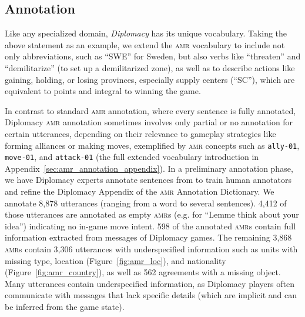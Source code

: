 \documentclass[oneside]{memoir}
\newcommand{\amr}[1]{\texttt{#1}}
\newcommand{\abr}[1]{\textsc{#1}}
\begin{document}
\subsection{Annotation}
\label{sec:amr_annotation}

%
Like any specialized domain, \textit{Diplomacy} has its unique
vocabulary.
%
Taking the above statement as an example, we extend the \abr{amr}
vocabulary to include not only abbreviations, such as ``SWE'' for
Sweden, but also verbs like ``threaten'' and ``demilitarize'' (to set
up a demilitarized zone), as well as to describe actions like gaining,
holding, or losing provinces, especially supply centers (``SC''),
which are equivalent to points and integral to winning the game.

In contrast to standard \abr{amr} annotation, where every sentence is fully annotated, Diplomacy \abr{amr} annotation sometimes involves only partial or no annotation for certain utterances, depending on their relevance to gameplay strategies like forming alliances or making moves, exemplified by \abr{amr} concepts such as \amr{ally-01}, \amr{move-01}, and \amr{attack-01} (the full extended vocabulary introduction in
Appendix~\ref{sec:amr_annotation_appendix}).
%
In a preliminary annotation phase, we have Diplomacy experts annotate sentences from \citet{peskov2020takes} to train human annotators and refine the Diplomacy Appendix of the \abr{amr} Annotation Dictionary.
%
We annotate 8,878 utterances
(ranging from a word to several sentences).
%
4,412 of those utterances are annotated as empty \abr{amr}s (e.g. for
``Lemme think about your idea'') indicating no in-game move intent.
%
598 of the annotated \abr{amr}s contain full information
extracted from messages of Diplomacy games. The remaining 3,868 \abr{amr}s
contain 3,306 utterances with underspecified information such as units
with missing type, location (Figure~\ref{fig:amr_loc}), and nationality (Figure~\ref{fig:amr_country}), as well as 562 agreements with a
missing object.
Many utterances contain underspecified information, as Diplomacy players often communicate with messages that lack specific details (which are implicit and can be inferred from the game state).
\end{document}
